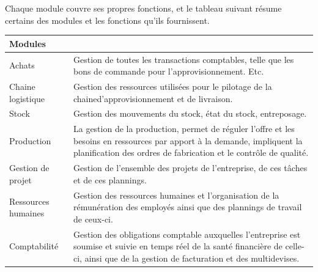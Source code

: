 Chaque module couvre ses propres fonctions, et le tableau suivant résume certains des modules et les fonctions qu'ils fournissent.

\begin{table}[H]
    \begin{center}
        
        \begin{tabular}{|F{4cm}|R{10cm}|}
            \hline
            \textbf{Modules}  &  \\
            \hline
            Achats
            &
            Gestion de toutes les transactions comptables, telle que les bons de commande pour l’approvisionnement. Etc.\\
            
            \hline
            Chaine logistique
            &
            Gestion des ressources utilisées pour le pilotage de la chained’approvisionnement et de livraison.\\
            
            \hline
            Stock
            &
            Gestion des mouvements du stock, état du stock, entreposage.\\
            
            \hline
            Production
            &
            La gestion de la production, permet de réguler l’offre et les besoins en
            ressources par apport à la demande, impliquent la planification des ordres
            de fabrication et le contrôle de qualité.\\
            
            \hline
            Gestion de projet
            &
            Gestion de l’ensemble des projets de l’entreprise, de ces tâches et de ces plannings.\\
            
            \hline
            Ressources humaines
            &
            Gestion des ressources humaines et l’organisation de la rémunération des employés ainsi que des plannings de travail de ceux-ci.\\
            
            
            \hline
            Comptabilité
            &
            Gestion des obligations comptable auxquelles l’entreprise est soumise et suivie en temps réel de la santé financière de celle-ci, ainsi que de la gestion de facturation et des multidevises.\\
            

\end{tabular}
\end{center}
\end{table}
